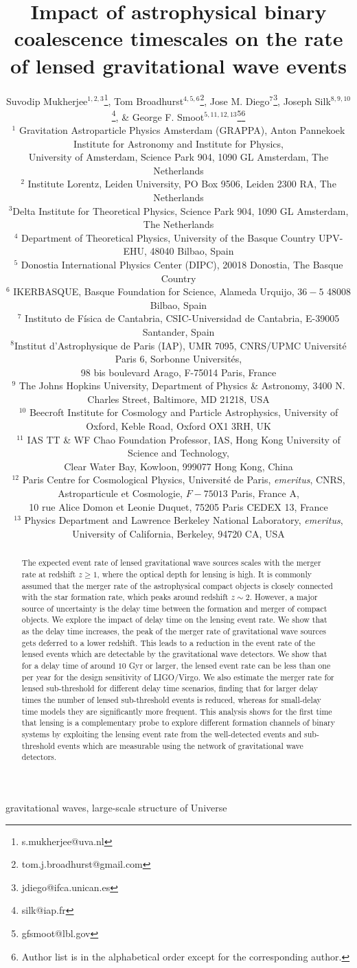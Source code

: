 \documentclass[a4paper,useAMS,usenatbib]{mnras}
\title[Delay time \& lensing event rate]{Impact of astrophysical binary coalescence timescales on the rate of lensed gravitational wave events}
\author[Mukherjee, Broadhurst, Diego, Silk, Smoot (2021)]
{Suvodip Mukherjee$^{1,2,3}$\thanks{s.mukherjee@uva.nl}, Tom  Broadhurst$^{4,5,6}$\thanks{tom.j.broadhurst@gmail.com}, Jose M. Diego$^{7}$\thanks{jdiego@ifca.unican.es}, Joseph Silk$^{8,9, 10}$\thanks{silk@iap.fr}, 
\newauthor
\& George F. Smoot$^{5,11,12, 13}$\thanks{gfsmoot@lbl.gov}\thanks{Author list is in the alphabetical order except for the corresponding author.}\\
$^{1}$ Gravitation Astroparticle Physics Amsterdam (GRAPPA),
Anton Pannekoek Institute for Astronomy and Institute for Physics,\\
University of Amsterdam, Science Park 904, 1090 GL Amsterdam, The Netherlands\\
$^2$ Institute Lorentz, Leiden University, PO Box 9506, Leiden 2300 RA, The Netherlands\\
$^3$Delta Institute for Theoretical Physics, Science Park 904, 1090 GL Amsterdam, The Netherlands\\
$^{4}$ Department of Theoretical Physics, University of the Basque Country UPV-EHU, 48040 Bilbao, Spain\\
$^5$ Donostia International Physics Center (DIPC), 20018 Donostia, The Basque Country\\
$^6$ IKERBASQUE, Basque Foundation for Science, Alameda Urquijo, $36-5$ 48008 Bilbao, Spain\\
$^7$ Instituto de F\'isica de Cantabria, CSIC-Universidad de Cantabria, E-39005 Santander, Spain\\
$^{8}$Institut d'Astrophysique de Paris (IAP), UMR 7095, CNRS/UPMC Universit\'e Paris 6, Sorbonne Universit\'es,\\ 98 bis boulevard Arago, F-75014 Paris, France\\
$^9$ The Johns Hopkins University, Department of Physics \& Astronomy, 3400 N. Charles Street, Baltimore, MD 21218, USA\\
$^{10}$ Beecroft Institute for Cosmology and Particle Astrophysics, University of Oxford, Keble Road, Oxford OX1 3RH, UK\\
$^{11}$ IAS TT \& WF Chao Foundation Professor, IAS, Hong Kong University of Science and Technology,\\
Clear Water Bay, Kowloon, 999077 Hong Kong, China\\
$^{12}$ Paris Centre for Cosmological Physics, Universit\'e de Paris, {\it emeritus},
CNRS, Astroparticule et Cosmologie, $F-75013$ Paris, France A,\\
10 rue Alice Domon et Leonie Duquet, 75205 Paris CEDEX 13, France\\
$^{13}$  Physics Department and Lawrence Berkeley National Laboratory, {\it emeritus}, University of California, Berkeley, 94720 CA, USA\\
}
\begin{document}
\label{firstpage}
\pagerange{\pageref{firstpage}--\pageref{lastpage}}
\maketitle

\label{firstpage}

\begin{abstract}
The expected event rate of lensed gravitational wave sources scales with the merger rate at redshift $z\geq 1$, where the optical depth for lensing is high. It is commonly assumed that the merger rate of the astrophysical compact objects is closely connected with the star formation rate, which peaks around redshift $z\sim 2$. However, a major source of uncertainty is the delay time between the formation and merger of compact objects. We explore the impact of delay time on the lensing event rate. We show that as the delay time increases, the peak of the merger rate of gravitational wave sources gets deferred to a lower redshift.  This leads to a reduction in the event rate of the lensed events which are detectable by the gravitational wave detectors. We show that for a delay time of around $10$ Gyr or larger, the lensed event rate can be less than one per year for the design sensitivity of LIGO/Virgo. We also estimate the merger rate for lensed sub-threshold for different delay time scenarios, finding that for larger delay times the number of lensed sub-threshold events is reduced, whereas for small-delay time models they are significantly more frequent. This analysis shows for the first time that lensing is a complementary probe to explore different formation channels of binary systems by exploiting the lensing event rate from the well-detected events and sub-threshold events which are measurable using the network of gravitational wave detectors. 
\end{abstract}

\begin{keywords} 
gravitational waves, large-scale structure of Universe
\end{keywords}
\end{document}
